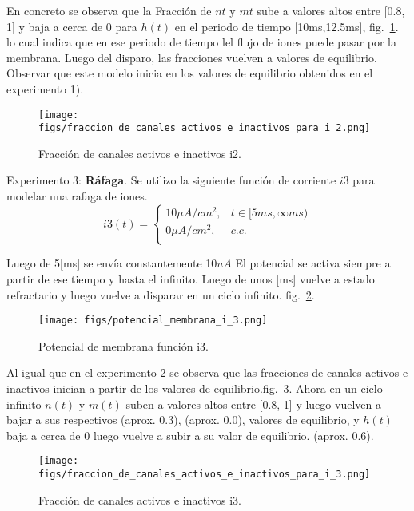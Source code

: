 \documentclass[aps,prl,twocolumn,groupedaddress]{revtex4-2}
\begin{document}
En concreto se observa que la Fracción de $nt$ y $mt$ sube a valores altos entre [0.8, 1] y baja a cerca de  0 para $h(t)$ en el periodo de tiempo [10ms,12.5ms],
fig.~\ref{fig4}. lo cual indica que en ese periodo de tiempo lel flujo de iones puede pasar por la membrana.
Luego del disparo, las fracciones vuelven a valores de equilibrio.
Observar que este modelo inicia en los valores de equilibrio obtenidos en el experimento 1).\\



\begin{figure}[h!]
\centering
\texttt{[image: figs/fraccion\_de\_canales\_activos\_e\_inactivos\_para\_i\_2.png]}
\caption{Fracción de canales activos e inactivos i2. \label{fig4}}
\end{figure}

Experimento 3: \textbf{Ráfaga}. Se utilizo la siguiente función de corriente $i3$ para modelar una rafaga de iones.
$$
i3(t) = \left\{
\begin{array}{ll}
10 \mu A/cm^2, & t\in [5ms,\infty ms) \\
0 \mu A/cm^2, & c.c. \\
\end{array}
\right.
$$

Luego de 5[ms] se envía constantemente 10$uA$
El potencial se activa siempre a partir de ese tiempo y hasta el infinito.
Luego de unos [ms] vuelve a estado refractario y luego vuelve a disparar en un ciclo infinito. fig.~\ref{fig5}.



\begin{figure}[h!]
\centering
\texttt{[image: figs/potencial\_membrana\_i\_3.png]}
\caption{Potencial de membrana función i3. \label{fig5}}
\end{figure}

Al igual que en el experimento 2 se observa que las fracciones de canales activos e inactivos inician a partir de los valores de equilibrio.fig.~\ref{fig6}.
Ahora en un ciclo infinito $n(t)$ y $m(t)$ suben a valores altos entre
[0.8, 1] y luego vuelven a bajar a sus respectivos (aprox. 0.3), (aprox. 0.0), valores de equilibrio,
y $h(t)$ baja a cerca de 0   luego vuelve a subir a su valor de equilibrio. (aprox. 0.6).



\begin{figure}[h!]
\centering
\texttt{[image: figs/fraccion\_de\_canales\_activos\_e\_inactivos\_para\_i\_3.png]}
\caption{Fracción de canales activos e inactivos i3. \label{fig6}}
\end{figure}
\end{document}
